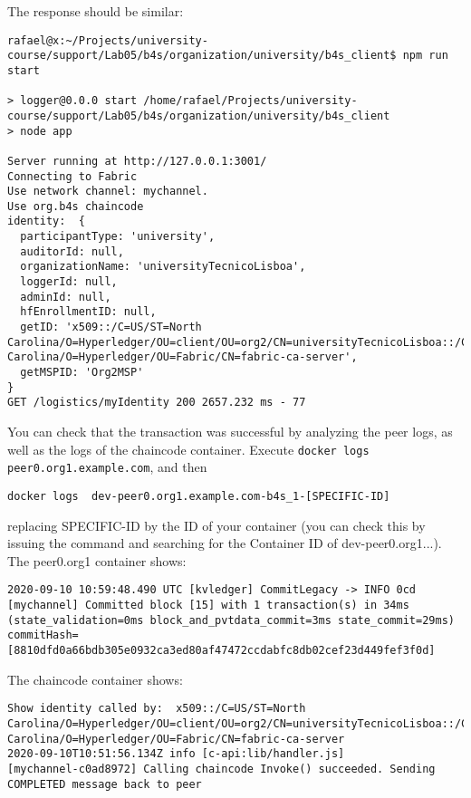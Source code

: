 \documentclass[12pt,a4paper]{article}
\theoremstyle{definition}
\begin{document}
The response should be similar:
\begin{verbatim}
rafael@x:~/Projects/university-course/support/Lab05/b4s/organization/university/b4s_client$ npm run start

> logger@0.0.0 start /home/rafael/Projects/university-course/support/Lab05/b4s/organization/university/b4s_client
> node app

Server running at http://127.0.0.1:3001/
Connecting to Fabric
Use network channel: mychannel.
Use org.b4s chaincode
identity:  {
  participantType: 'university',
  auditorId: null,
  organizationName: 'universityTecnicoLisboa',
  loggerId: null,
  adminId: null,
  hfEnrollmentID: null,
  getID: 'x509::/C=US/ST=North Carolina/O=Hyperledger/OU=client/OU=org2/CN=universityTecnicoLisboa::/C=US/ST=North Carolina/O=Hyperledger/OU=Fabric/CN=fabric-ca-server',
  getMSPID: 'Org2MSP'
}
GET /logistics/myIdentity 200 2657.232 ms - 77

\end{verbatim}

You can check that the transaction was successful by analyzing the peer logs, as well as the logs of the chaincode container. Execute \texttt{docker logs peer0.org1.example.com}, and then 

\begin{verbatim}
docker logs  dev-peer0.org1.example.com-b4s_1-[SPECIFIC-ID]
\end{verbatim}

replacing SPECIFIC-ID by the ID of your container (you can check this by issuing the command  and searching for the Container ID of dev-peer0.org1...).
The peer0.org1 container shows:
\begin{verbatim}
2020-09-10 10:59:48.490 UTC [kvledger] CommitLegacy -> INFO 0cd [mychannel] Committed block [15] with 1 transaction(s) in 34ms (state_validation=0ms block_and_pvtdata_commit=3ms state_commit=29ms) commitHash=[8810dfd0a66bdb305e0932ca3ed80af47472ccdabfc8db02cef23d449fef3f0d]
\end{verbatim}




The chaincode container shows:
\begin{verbatim}
Show identity called by:  x509::/C=US/ST=North Carolina/O=Hyperledger/OU=client/OU=org2/CN=universityTecnicoLisboa::/C=US/ST=North Carolina/O=Hyperledger/OU=Fabric/CN=fabric-ca-server
2020-09-10T10:51:56.134Z info [c-api:lib/handler.js]                              [mychannel-c0ad8972] Calling chaincode Invoke() succeeded. Sending COMPLETED message back to peer 
\end{verbatim}
\end{document}

